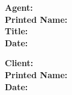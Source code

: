 \documentclass[12pt]{article}
\begin{document}
\vspace{1cm}

\noindent \textbf{Agent:} \underline{\hspace{7cm}}\\[0.5cm]
\textbf{Printed Name:} \underline{\hspace{7cm}}\\[0.5cm]
\textbf{Title:} \underline{\hspace{7cm}}\\[0.5cm]
\textbf{Date:} \underline{\hspace{7cm}}

\vspace{1cm}

\noindent \textbf{Client:} \underline{\hspace{7cm}}\\[0.5cm]
\textbf{Printed Name:} \underline{\hspace{7cm}}\\[0.5cm]
\textbf{Date:} \underline{\hspace{7cm}}
\end{document}
